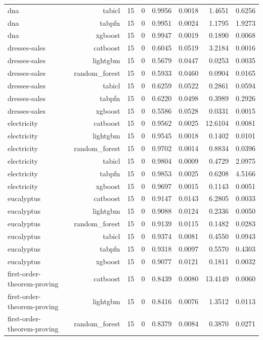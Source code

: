 \begin{table}[htbp]
\begin{tabular}{lrrrrrrr}
dna & tabicl & 15 & 0 & 0.9956 & 0.0018 & 1.4651 & 0.6256 \\
dna & tabpfn & 15 & 0 & 0.9951 & 0.0024 & 1.1795 & 1.9273 \\
dna & xgboost & 15 & 0 & 0.9947 & 0.0019 & 0.1890 & 0.0068 \\
dresses-sales & catboost & 15 & 0 & 0.6045 & 0.0519 & 3.2184 & 0.0016 \\
dresses-sales & lightgbm & 15 & 0 & 0.5679 & 0.0447 & 0.0253 & 0.0035 \\
dresses-sales & random\_forest & 15 & 0 & 0.5933 & 0.0460 & 0.0904 & 0.0165 \\
dresses-sales & tabicl & 15 & 0 & 0.6259 & 0.0522 & 0.2861 & 0.0594 \\
dresses-sales & tabpfn & 15 & 0 & 0.6220 & 0.0498 & 0.3989 & 0.2926 \\
dresses-sales & xgboost & 15 & 0 & 0.5586 & 0.0528 & 0.0331 & 0.0015 \\
electricity & catboost & 15 & 0 & 0.9562 & 0.0025 & 12.6104 & 0.0081 \\
electricity & lightgbm & 15 & 0 & 0.9545 & 0.0018 & 0.1402 & 0.0101 \\
electricity & random\_forest & 15 & 0 & 0.9702 & 0.0014 & 0.8834 & 0.0396 \\
electricity & tabicl & 15 & 0 & 0.9804 & 0.0009 & 0.4729 & 2.0975 \\
electricity & tabpfn & 15 & 0 & 0.9853 & 0.0025 & 0.6208 & 4.5166 \\
electricity & xgboost & 15 & 0 & 0.9697 & 0.0015 & 0.1143 & 0.0051 \\
eucalyptus & catboost & 15 & 0 & 0.9147 & 0.0143 & 6.2805 & 0.0033 \\
eucalyptus & lightgbm & 15 & 0 & 0.9088 & 0.0124 & 0.2336 & 0.0050 \\
eucalyptus & random\_forest & 15 & 0 & 0.9139 & 0.0115 & 0.1482 & 0.0283 \\
eucalyptus & tabicl & 15 & 0 & 0.9374 & 0.0081 & 0.4550 & 0.0943 \\
eucalyptus & tabpfn & 15 & 0 & 0.9318 & 0.0097 & 0.5570 & 0.4303 \\
eucalyptus & xgboost & 15 & 0 & 0.9077 & 0.0121 & 0.1811 & 0.0032 \\
first-order-theorem-proving & catboost & 15 & 0 & 0.8439 & 0.0080 & 13.4149 & 0.0060 \\
first-order-theorem-proving & lightgbm & 15 & 0 & 0.8416 & 0.0076 & 1.3512 & 0.0113 \\
first-order-theorem-proving & random\_forest & 15 & 0 & 0.8379 & 0.0084 & 0.3870 & 0.0271 \\

\end{tabular}
\end{table}
